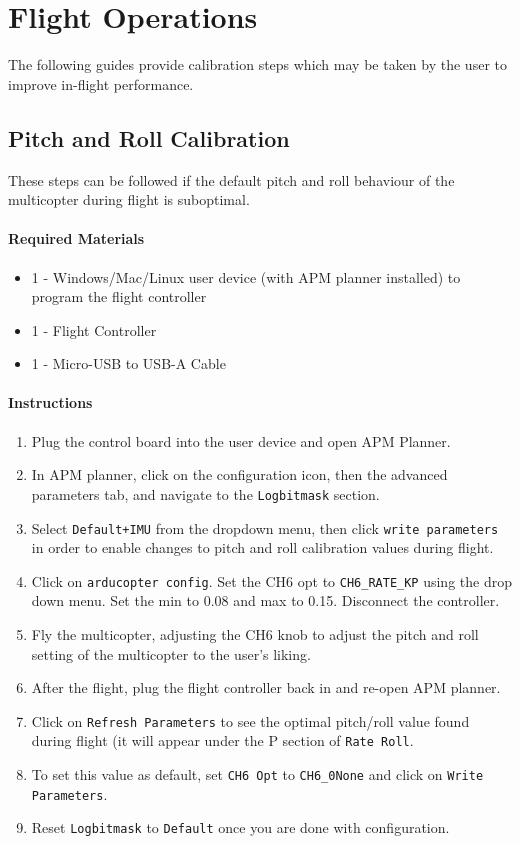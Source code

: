 \documentclass[10pt,letterpaper]{article}
\begin{document}
\section{Flight Operations}
The following guides provide calibration steps which may be taken by the user to improve in-flight performance.

\subsection{Pitch and Roll Calibration}
These steps can be followed if the default pitch and roll behaviour of the multicopter during flight is suboptimal.

\paragraph{Required Materials}
\begin{itemize}
    \item 1 - Windows/Mac/Linux user device (with APM planner installed) to program the flight controller 
\item 1 - Flight Controller
\item 1 - Micro-USB to USB-A Cable
\end{itemize}

\paragraph{Instructions}
\begin{enumerate}
	\item Plug the control board into the user device and open APM Planner.
    \item In APM planner, click on the configuration icon, then the advanced parameters tab, and navigate to the \texttt{Logbitmask} section. 
    \item Select \texttt{Default+IMU} from the dropdown menu, then click \texttt{write parameters} in order to enable changes to pitch and roll calibration values during flight.
    \item Click on \texttt{arducopter config}. Set the CH6 opt to \texttt{CH6\_RATE\_KP} using the drop down menu. Set the min to 0.08 and max to 0.15. Disconnect the controller.
    \item Fly the multicopter, adjusting the CH6 knob to adjust the pitch and roll setting of the multicopter to the user's liking. 
    \item After the flight, plug the flight controller back in and re-open APM planner. 
    \item Click on \texttt{Refresh Parameters} to see the optimal pitch/roll value found during flight (it will appear under the P section of \texttt{Rate Roll}. 
    \item To set this value as default, set \texttt{CH6 Opt} to \texttt{CH6\_0None} and click on \texttt{Write Parameters}.
    \item Reset \texttt{Logbitmask} to \texttt{Default} once you are done with configuration.

\end{enumerate}
\end{document}

